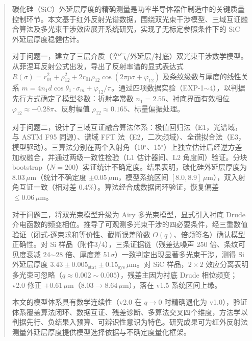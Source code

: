 \begin{abstract}

碳化硅（SiC）外延层厚度的精确测量是功率半导体器件制造中的关键质量控制环节。本文基于红外反射光谱数据，围绕双光束干涉模型、三域互证融合算法及多光束干涉效应展开系统研究，实现了无标定参照条件下的 SiC 外延层厚度稳健估计。

对于问题一，建立了三层介质（空气/外延层/衬底）双光束干涉数学模型。从菲涅耳反射公式出发，导出了反射率谱的显式表达式 $R(\sigma)=r_{01}^2+\rho_{12}^2+2r_{01}\rho_{12}\cos(2\pi p\sigma+\varphi_{12})$ 及条纹级数与厚度的线性关系 $m=4n_1d\cos\theta_1\cdot\sigma_m+\varphi_{12}/\pi$。通过四项数据实验（EXP-1$\sim$4），以判据先行方式确定了模型参数：折射率常数 $n_1=2.55$、衬底界面有效相位 $\varphi_{12}\approx-0.28\pi$、反射幅值 $\rho_{12}\approx0.165$、标量偏振处理。

对于问题二，设计了三域互证融合算法体系：极值回归法（E1，光谱域，与 ASTM F95 同源）、谱域 FFT 法（E2，二次频域）、全谱拟合法（E3，模型驱动）。三算法分别在两个入射角（10$^\circ$、15$^\circ$）上独立估计后经逆方差加权融合，并通过两级一致性检验（L1 估计器间、L2 角度间）验证。分块 bootstrap（$N=200$）实证统计不确定度。结果表明，碳化硅外延层厚度为 8.03\,$\mu$m（统计不确定度 $\pm0.05\,\mu$m，模型系统区间 $[8.0,8.9]\,\mu$m），双入射角互证一致（相对差 0.4\%）。算法经合成数据闭环验证，恢复偏差 $\leq0.06\,\mu$m。

对于问题三，将双光束模型升级为 Airy 多光束模型，显式引入衬底 Drude 介电函数的频变相位。推导了可观测多光束干涉的四必要条件，经三重数值验证（闭式-逐束求和等价性、截断误差阶数 $O(q)$、倍频签名）确认模型正确性。对 Si 样品（附件3/4），三条证据链（残差达噪声 250 倍、条纹可见度衰减 24$\sim$28 倍、厚度差 51$\sigma$）一致判定出现显著多光束干涉，测得 Si 外延层厚度 $3.43\pm0.005_{\text{stat}}\pm0.15_{\text{sys}}\,\mu$m。对 SiC 样品，$2\times2$ 效应分离表明多光束可忽略（$q\approx0.002\sim0.005$），残差主因为衬底 Drude 相位频变；v2.0 修正 $+0.61\,\mu$m（$8.03\rightarrow8.64\,\mu$m），落在 v1.5 系统区间上缘。

本文的模型体系具有数学连续性（v2.0 在 $q\to0$ 时精确退化为 v1.0），验证体系覆盖算法闭环、数据互证、残差诊断、多算法交叉四个维度，方法学以判据先行、负结果入预算、可辨识性意识为特色。研究成果可为红外反射法测量外延层厚度提供模型选择依据与不确定度量化框架。


\end{abstract}